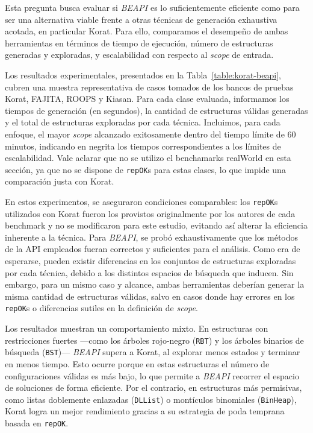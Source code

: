 Esta pregunta busca evaluar si \emph{BEAPI} es lo suficientemente eficiente como para ser una 
alternativa viable frente a otras técnicas de generación exhaustiva acotada, en particular 
\textsf{Korat}. Para ello, comparamos el desempeño de ambas herramientas en términos de tiempo 
de ejecución, número de estructuras generadas y exploradas, y escalabilidad con respecto al 
\emph{scope} de entrada.

Los resultados experimentales, presentados en la Tabla~\ref{table:korat-beapi}, cubren una muestra 
representativa de casos tomados de los bancos de pruebas \textsf{Korat}, \textsf{FAJITA}, 
\textsf{ROOPS} y \textsf{Kiasan}. Para cada clase evaluada, informamos los tiempos de generación 
(en segundos), la cantidad de estructuras válidas generadas y el total de estructuras exploradas 
por cada técnica. Incluimos, para cada enfoque, el mayor \emph{scope} alcanzado exitosamente dentro 
del tiempo límite de 60 minutos, indicando en negrita los tiempos correspondientes a los límites 
de escalabilidad. Vale aclarar que no se utilizo el benchamarks \textsf{realWorld} en esta sección, ya que
no se dispone de \texttt{repOK}s para estas clases, lo que impide una comparación justa con \textsf{Korat}.

En estos experimentos, se aseguraron condiciones comparables: los \texttt{repOK}s utilizados con 
\textsf{Korat} fueron los provistos originalmente por los autores de cada benchmark y no se 
modificaron para este estudio, evitando así alterar la eficiencia inherente a la técnica. 
Para \emph{BEAPI}, se probó exhaustivamente que los métodos de la API empleados fueran correctos 
y suficientes para el análisis. Como era de esperarse, pueden existir diferencias en los conjuntos 
de estructuras exploradas por cada técnica, debido a los distintos espacios de búsqueda que inducen. 
Sin embargo, para un mismo caso y alcance, ambas herramientas deberían generar la misma cantidad 
de estructuras válidas, salvo en casos donde hay errores en los \texttt{repOK}s o diferencias sutiles 
en la definición de \emph{scope}.

Los resultados muestran un comportamiento mixto. En estructuras con restricciones fuertes —como los 
árboles rojo-negro (\texttt{RBT}) y los árboles binarios de búsqueda (\texttt{BST})— \emph{BEAPI} 
supera a \textsf{Korat}, al explorar menos estados y terminar en menos tiempo. Esto ocurre porque 
en estas estructuras el número de configuraciones válidas es más bajo, lo que permite a \emph{BEAPI} 
recorrer el espacio de soluciones de forma eficiente. Por el contrario, en estructuras más permisivas, 
como listas doblemente enlazadas (\texttt{DLList}) o montículos binomiales (\texttt{BinHeap}), 
\textsf{Korat} logra un mejor rendimiento gracias a su estrategia de poda temprana basada en 
\texttt{repOK}.

